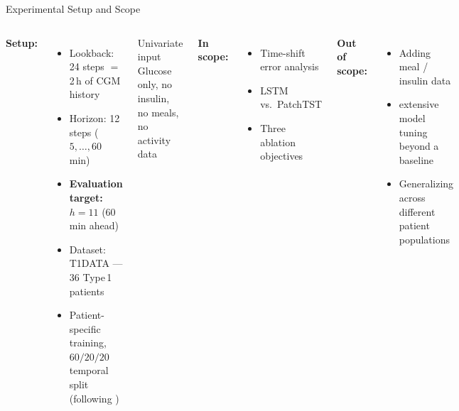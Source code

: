 \begin{frame}[t]{Experimental Setup and Scope}
  \begin{columns}[T]
    \textbf{Setup:}
    \begin{itemize}
      \item Lookback: 24 steps $=$ 2\,h of CGM history
      \item Horizon: 12 steps ($5,\ldots,60$\,min)
      \item \textbf{Evaluation target:} $h{=}11$ (60\,min ahead)
      \item Dataset: T1DATA --- 36 Type\,1 patients \cite{garcia_tirado2023}
      \item Patient-specific training, $60/20/20$ temporal split (following \cite{huni2023})
    \end{itemize}
    \vspace{2pt}
    \begin{alertblock}{Univariate input}
      Glucose only, no insulin, no meals, no activity data
    \end{alertblock}

    \textbf{In scope:}
    \begin{itemize}
      \item Time-shift error analysis
      \item LSTM vs.\ PatchTST
      \item Three ablation objectives
    \end{itemize}
    \vspace{4pt}
    \textbf{Out of scope:}
    \begin{itemize}
      \item Adding meal / insulin data
      \item extensive model tuning beyond a baseline
      \item Generalizing across different patient populations
    \end{itemize}
  \end{columns}
\end{frame}

